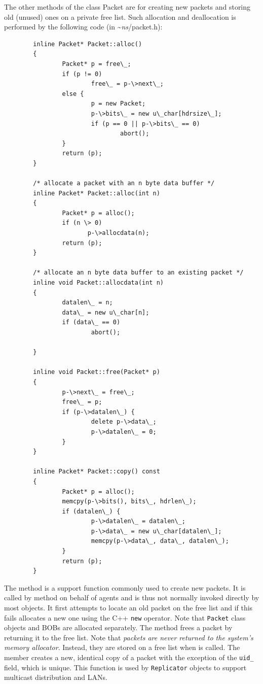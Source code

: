 The other methods of the class Packet are for creating new
packets and storing old (unused) ones on a private free list.
Such allocation and deallocation is performed by the
following code (in \textasciitilde\emph{ns}/{packet.h}):
\begin{verbatim}
        inline Packet* Packet::alloc()
        {
                Packet* p = free\_;
                if (p != 0)
                        free\_ = p-\>next\_;
                else {
                        p = new Packet;
                        p-\>bits\_ = new u\_char[hdrsize\_];
                        if (p == 0 || p-\>bits\_ == 0)
                                abort();
                }
                return (p);
        }

        /* allocate a packet with an n byte data buffer */
        inline Packet* Packet::alloc(int n)
        {
                Packet* p = alloc();
                if (n \> 0)
                       p-\>allocdata(n);
                return (p);
        }
                
        /* allocate an n byte data buffer to an existing packet */
        inline void Packet::allocdata(int n)
        {       
                datalen\_ = n; 
                data\_ = new u\_char[n];
                if (data\_ == 0)
                        abort();
         
        }       

        inline void Packet::free(Packet* p)
        {
                p-\>next\_ = free\_;
                free\_ = p;
                if (p-\>datalen\_) {
                        delete p-\>data\_;
                        p-\>datalen\_ = 0;
                }
        }       
         
        inline Packet* Packet::copy() const
        {               
                Packet* p = alloc();
                memcpy(p-\>bits(), bits\_, hdrlen\_);  
                if (datalen\_) { 
                        p-\>datalen\_ = datalen\_;
                        p-\>data\_ = new u\_char[datalen\_];
                        memcpy(p-\>data\_, data\_, datalen\_);
                }
                return (p);
        }
\end{verbatim}
The  method is a support function commonly
used to create new packets.
It is called by  method on
behalf of agents and is thus not normally invoked directly by most objects.
It first attempts to locate an old packet on the free list and
if this fails allocates a new one using the C++ {\tt new} operator.
Note that {\tt Packet} class objects and BOBs are
allocated separately.
The  method frees a packet by returning it to the free
list.
Note that \emph{packets are never returned to the system's memory allocator}.
Instead, they are stored on a free list when  is called.
The  member creates a new, identical copy of a packet
with the exception of the {\tt uid\_} field, which is unique.
This function is used by {\tt Replicator} objects to support
multicast distribution and LANs.

